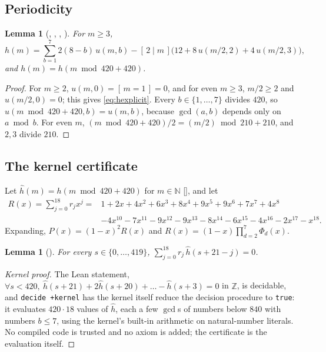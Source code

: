 \documentclass[11pt]{amsart}
\theoremstyle{plain}
\newtheorem{lemma}[theorem]{Lemma}
\theoremstyle{definition}
\newcommand{\N}{\mathbb{N}}
\newcommand{\Z}{\mathbb{Z}}
\newcommand{\ind}[1]{[\,#1\,]}
\begin{document}
\subsection{Periodicity}
\begin{lemma}[, , , ]\label{lem:period}
For $m\ge3$,
\begin{equation}\label{eq:hexplicit}
h(m)=\sum_{b=1}^{7}2(8-b)\,u(m,b)-\ind{2\mid m}\bigl(12+8\,u(m/2,2)+4\,u(m/2,3)\bigr),
\end{equation}
and $h(m)=h(m\bmod 420+420)$.
\end{lemma}

\begin{proof}
For $m\ge2$, $u(m,0)=\ind{m=1}=0$, and for even $m\ge3$, $m/2\ge2$ and $u(m/2,0)=0$; this gives \eqref{eq:hexplicit}. Every $b\in\{1,\dots,7\}$ divides $420$, so $u(m\bmod420+420,b)=u(m,b)$, because $\gcd(a,b)$ depends only on $a\bmod b$. For even $m$, $(m\bmod420+420)/2=(m/2)\bmod210+210$, and $2,3$ divide $210$.
\end{proof}

\subsection{The kernel certificate}
Let $\hat h(m)=h(m\bmod420+420)$ for $m\in\N$ [], and let
\[
\begin{aligned}
R(x)=\sum_{j=0}^{18}r_jx^j={}&1+2x+4x^2+6x^3+8x^4+9x^5+9x^6+7x^7+4x^8\\
&-4x^{10}-7x^{11}-9x^{12}-9x^{13}-8x^{14}-6x^{15}-4x^{16}-2x^{17}-x^{18}.
\end{aligned}
\]
Expanding, $P(x)=(1-x)^2R(x)$ and $R(x)=(1-x)\prod_{d=2}^{7}\Phi_d(x)$.

\begin{lemma}[]\label{lem:key}
For every $s\in\{0,\dots,419\}$, $\sum_{j=0}^{18}r_j\,\hat h(s+21-j)=0$.
\end{lemma}

\begin{proof}[Kernel proof]
The Lean statement, $\forall s<420,\ \hat h(s+21)+2\hat h(s+20)+\dots-\hat h(s+3)=0$ in $\Z$, is decidable, and \texttt{decide +kernel} has the kernel itself reduce the decision procedure to \texttt{true}: it evaluates $420\cdot18$ values of $\hat h$, each a few $\gcd$s of numbers below $840$ with numbers $b\le7$, using the kernel's built-in arithmetic on natural-number literals. No compiled code is trusted and no axiom is added; the certificate is the evaluation itself.
\end{proof}
\end{document}

